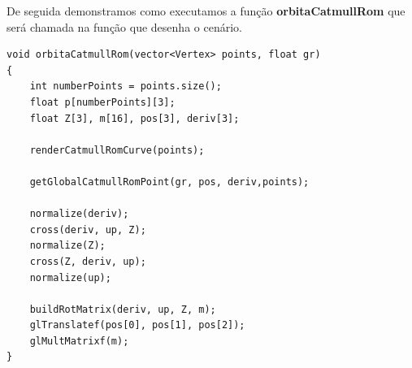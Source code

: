 \documentclass[12pt]{article}
\begin{document}
De seguida demonstramos como executamos a função \textbf{orbitaCatmullRom} que será chamada na função que desenha o cenário.
\begin{lstlisting}
void orbitaCatmullRom(vector<Vertex> points, float gr)
{
    int numberPoints = points.size();
    float p[numberPoints][3];
    float Z[3], m[16], pos[3], deriv[3];

    renderCatmullRomCurve(points);

    getGlobalCatmullRomPoint(gr, pos, deriv,points);

    normalize(deriv);
    cross(deriv, up, Z);
    normalize(Z);
    cross(Z, deriv, up);
    normalize(up);

    buildRotMatrix(deriv, up, Z, m);
    glTranslatef(pos[0], pos[1], pos[2]);
    glMultMatrixf(m);
}
\end{lstlisting}
\end{document}

